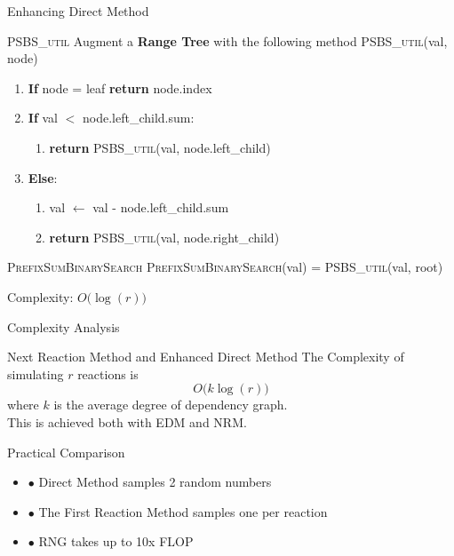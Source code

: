 \documentclass{beamer}
\begin{document}
\begin{frame}{Enhancing Direct Method}
  \begin{block}{\textsc{PSBS\_util}}
    Augment a \textbf{Range Tree} with the following method
    \textsc{PSBS\_util}(val, node)
    \begin{enumerate}
    \item \textbf{If} node = leaf \textbf{return} node.index
    \item \textbf{If} val $<$ node.left\_child.sum:
      \begin{enumerate}
      \item \textbf{return} \textsc{PSBS\_util}(val, node.left\_child)
      \end{enumerate}
    \item \textbf{Else}:
      \begin{enumerate}
      \item val $\leftarrow$ val - node.left\_child.sum 
      \item \textbf{return} \textsc{PSBS\_util}(val, node.right\_child)
      \end{enumerate}
    \end{enumerate}
  \end{block}
  \pause
  \begin{block}{\textsc{PrefixSumBinarySearch}}
    \textsc{PrefixSumBinarySearch}(val) =  \textsc{PSBS\_util}(val, root) 
    \begin{center}
      Complexity: $O\bigl(\log(r)\bigr)$
    \end{center}
  \end{block}
\end{frame}

\begin{frame}{Complexity Analysis}
  \begin{block}{Next Reaction Method and Enhanced Direct Method}
    The Complexity of simulating $r$ reactions is
    $$ O\bigl(k \log(r)\bigr) $$
    where $k$ is the average degree of dependency graph. \\
    \vspace{2.5pt}
    This is achieved both with EDM and NRM.
  \end{block}
  \pause
\begin{block}{Practical Comparison}
    \begin{itemize} 
    \item $\bullet$ Direct Method samples 2 random numbers
    \item $\bullet$ The First Reaction Method samples one per reaction 
    \item $\bullet$ RNG takes up to 10x FLOP
    \end{itemize}
  \end{block}
\end{frame}
\end{document}
